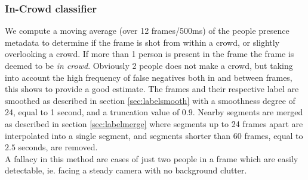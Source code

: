 \subsubsection{In-Crowd classifier}\label{sec:incrowd}
%
We compute a moving average (over 12 frames/500ms) of the people presence metadata to determine if the frame is shot from within a crowd, or slightly overlooking a crowd. If more than 1 person is present in the frame the frame is deemed to be \textit{in crowd}. Obviously 2 people does not make a crowd, but taking into account the high frequency of false negatives both in and between frames, this shows to provide a good estimate. The frames and their respective label are smoothed as described in section \ref{sec:labelsmooth} with a smoothness degree of 24, equal to 1 second, and a truncation value of $0.9$. Nearby segments are merged as described in section \ref{sec:labelmerge} where segments up to 24 frames apart are interpolated into a single segment, and segments shorter than 60 frames, equal to $2.5$ seconds, are removed.\\
A fallacy in this method are cases of just two people in a frame which are easily detectable, ie. facing a steady camera with no background clutter.\\
%
